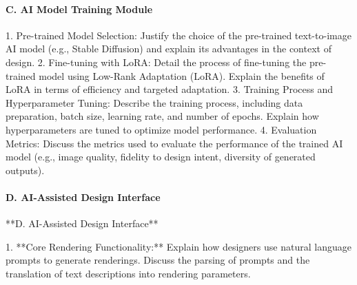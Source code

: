 \documentclass{article}
\begin{document}
\paragraph{C. AI Model Training Module}      1. Pre-trained Model Selection: Justify the choice of the pre-trained text-to-image AI model (e.g., Stable Diffusion) and explain its advantages in the context of design.
      2. Fine-tuning with LoRA: Detail the process of fine-tuning the pre-trained model using Low-Rank Adaptation (LoRA).  Explain the benefits of LoRA in terms of efficiency and targeted adaptation.
      3. Training Process and Hyperparameter Tuning: Describe the training process, including data preparation, batch size, learning rate, and number of epochs.  Explain how hyperparameters are tuned to optimize model performance.
      4. Evaluation Metrics:  Discuss the metrics used to evaluate the performance of the trained AI model (e.g., image quality, fidelity to design intent, diversity of generated outputs).

\paragraph{D. AI-Assisted Design Interface}
   **D. AI-Assisted Design Interface**

      1.  **Core Rendering Functionality:** Explain how designers use natural language prompts to generate renderings. Discuss the parsing of prompts and the translation of text descriptions into rendering parameters.
\end{document}
